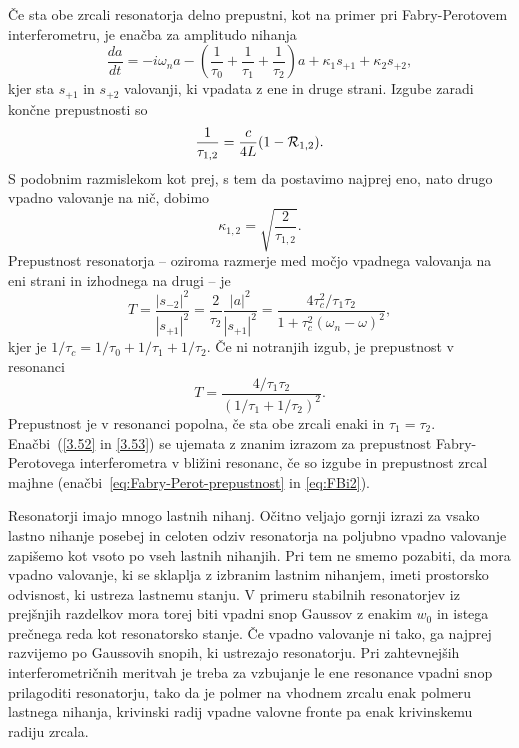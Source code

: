 Če sta obe zrcali resonatorja delno prepustni, kot na primer pri 
Fabry-Perotovem interferometru, je enačba za amplitudo nihanja 
\begin{equation}
\frac{da}{dt}=-i\omega_{n}a-\left(\frac{1}{\tau_{0}}+\frac{1}{\tau_{1}}+\frac{1}{\tau_{2}}\right)
a+\kappa_{1}s_{+1}+\kappa_{2}s_{+2},
\label{3.49}
\end{equation}
 kjer sta $s_{+1}$ in $s_{+2}$ valovanji, ki vpadata z ene in druge strani.
Izgube zaradi končne prepustnosti so
\begin{equation}
\frac{1}{\tau_{1,2}}=\frac{c}{4L}(1-{\cal R}_{1,2}).\label{3.50}
\end{equation}
S podobnim razmislekom kot prej, s tem da postavimo najprej eno, nato drugo
vpadno valovanje na nič, dobimo 
\begin{equation}
\kappa_{1,2}=\sqrt{\frac{2}{\tau_{1,2}}}.
\label{3.51}
\end{equation}
Prepustnost resonatorja -- oziroma razmerje med močjo vpadnega valovanja
na eni strani in izhodnega na drugi -- je
\begin{equation}
T=\frac{|s_{-2}|^{2}}{|s_{+1}|^{2}}=\frac{2}{\tau_{2}}\frac{|a|^{2}}{|s_{+1}|^{2}}=\frac{4\tau_c^{2}/
\tau_{1}\tau_{2}}{1+\tau_c^{2}(\omega_{n}-\omega)^{2}},
\label{3.52}
\end{equation}
 kjer je $1/\tau_c=1/\tau_{0}+1/\tau_{1}+1/\tau_{2}$. 
 Če ni notranjih izgub, je prepustnost v resonanci 
\begin{equation}
T=\frac{4/\tau_{1}\tau_{2}}{(1/\tau_{1}+1/\tau_{2})^{2}}.
\label{3.53}
\end{equation}
Prepustnost je v resonanci popolna, če sta obe zrcali enaki in $\tau_{1}=\tau_{2}$.
Enačbi~(\ref{3.52} in \ref{3.53}) se ujemata z znanim izrazom 
za prepustnost Fabry-Perotovega interferometra v bližini resonanc,
če so izgube in prepustnost zrcal majhne (enačbi~\ref{eq:Fabry-Perot-prepustnost} 
in \ref{eq:FBi2}). 

Resonatorji imajo mnogo lastnih nihanj. Očitno veljajo gornji izrazi
za vsako lastno nihanje posebej in celoten odziv resonatorja na poljubno vpadno
valovanje zapišemo kot vsoto po vseh lastnih nihanjih. Pri tem ne smemo pozabiti,
da mora vpadno valovanje, ki se sklaplja z izbranim lastnim nihanjem,
imeti prostorsko odvisnost, ki ustreza lastnemu stanju. V primeru
stabilnih resonatorjev iz prejšnjih razdelkov mora torej biti vpadni
snop Gaussov z enakim $w_{0}$ in istega prečnega reda kot resonatorsko
stanje. Če vpadno valovanje ni tako, ga najprej razvijemo po
Gaussovih snopih, ki ustrezajo resonatorju.
Pri zahtevnejših interferometričnih meritvah je treba za vzbujanje le ene 
resonance vpadni snop prilagoditi resonatorju, tako da je polmer na vhodnem 
zrcalu enak polmeru lastnega nihanja, krivinski radij vpadne valovne fronte 
pa enak krivinskemu radiju zrcala. 

